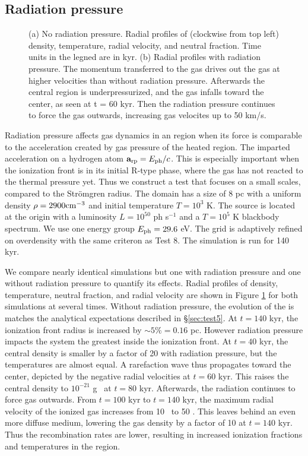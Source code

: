 \documentclass[12pt,preprint]{aastex}
\begin{document}
\subsection{Radiation pressure}

\begin{figure}[t]
  \caption{\label{fig:rp_profiles} (a) No radiation pressure.
    Radial profiles of (clockwise from top left) density, temperature,
    radial velocity, and neutral fraction.  Time units in the legned
    are in kyr.  (b) Radial profiles with radiation pressure.  The
    momentum transferred to the gas drives out the gas at higher
    velocities than without radiation pressure.  Afterwards the
    central region is underpressurized, and the gas infalls toward the
    center, as seen at t = 60 kyr.  Then the radiation pressure
    continues to force the gas outwards, increasing gas velocites up
    to 50 km/s.}
\end{figure}

Radiation pressure affects gas dynamics in an  region when
its force is comparable to the acceleration created by gas pressure of
the heated region.  The imparted acceleration on a hydrogen atom
$\mathbf{a}_{\rm rp} = E_{\rm ph}/c$.  This is especially important
when the ionization front is in its initial R-type phase, where the
gas has not reacted to the thermal pressure yet.  Thus we construct a
test that focuses on a small scales, compared to the Str\"{o}mgren
radius.  The domain has a size of 8 pc with a uniform density $\rho =
2900 \cubecm$ and initial temperature $T = 10^3$ K.  The source is
located at the origin with a luminosity $L = 10^{50}$ ph s$^{-1}$ and
a $T=10^5$ K blackbody spectrum.  We use one energy group $E_{\rm ph}
= 29.6$ eV.  The grid is adaptively refined on overdensity with the
same criteron as Test 8.  The simulation is run for 140 kyr.

We compare nearly identical simulations but one with radiation
pressure and one without radiation pressure to quantify its effects.
Radial profiles of density, temperature, neutral fraction, and radial
velocity are shown in Figure \ref{fig:rp_profiles} for both
simulations at several times.  Without radiation pressure, the
evolution of the  is matches the analytical expectations
described in \S\ref{sec:test5}.  At $t=140$ kyr, the ionization front
radius is increased by $\sim5\% = 0.16$ pc.  However radiation
pressure impacts the system the greatest inside the ionization front.
At $t = 40$ kyr, the central density is smaller by a factor of 20 with
radiation pressure, but the temperatures are almost equal.  A
rarefaction wave thus propagates toward the center, depicted by the
negative radial velocities at $t = 60$ kyr.  This raises the central
density to $10^{-21}$ g \cubecm~at $t = 80$ kyr.  Afterwards, the
radiation continues to force gas outwards.  From $t = 100$ kyr to $t =
140$ kyr, the maximum radial velocity of the ionized gas increases
from 10 \kms~to 50 \kms.  This leaves behind an even more diffuse
medium, lowering the gas density by a factor of 10 at $t = 140$ kyr.
Thus the recombination rates are lower, resulting in increased
ionization fractions and temperatures in the  region.
\end{document}
